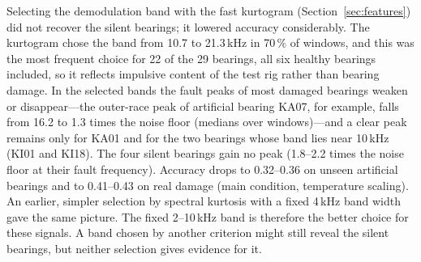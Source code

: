Selecting the demodulation band with the fast kurtogram (Section~\ref{sec:features}) did not recover the silent
bearings; it lowered accuracy considerably. The kurtogram chose the band from 10.7 to 21.3\,kHz in 70\,\% of windows,
and this was the most frequent choice for 22 of the 29 bearings, all six healthy bearings included, so it reflects
impulsive content of the test rig rather than bearing damage. In the selected bands the fault peaks of most damaged
bearings weaken or disappear---the outer-race peak of artificial bearing KA07, for example, falls from 16.2 to 1.3
times the noise floor (medians over windows)---and a clear peak remains only for KA01 and for the two bearings whose
band lies near 10\,kHz (KI01 and KI18). The four silent bearings gain no peak (1.8--2.2 times the noise floor at
their fault frequency). Accuracy drops to 0.32--0.36 on unseen artificial bearings and to 0.41--0.43 on real damage
(main condition, temperature scaling). An earlier, simpler selection by spectral kurtosis with a fixed 4\,kHz band
width gave the same picture. The fixed 2--10\,kHz band is therefore the better choice for these signals. A band chosen
by another criterion might still reveal the silent bearings, but neither selection gives evidence for it.
